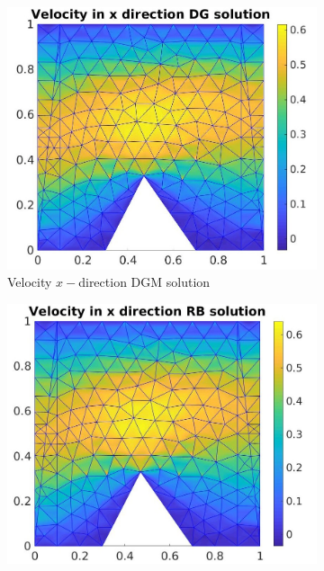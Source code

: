 \documentclass[graybox]{svmult}
\begin{document}
\begin{figure}[H] %
\begin{subfigure}{0.31\textwidth}
\includegraphics[width=\linewidth]{offline_velocity_1_at_47_33.jpg}
\caption{Velocity $x-$direction DGM solution} \label{vel_x_dg}
\end{subfigure}\hspace*{\fill}
\begin{subfigure}{0.31\textwidth}
\includegraphics[width=\linewidth]{online_velocity_1_at_47_33.jpg}

\end{subfigure}
\end{figure}
\end{document}
